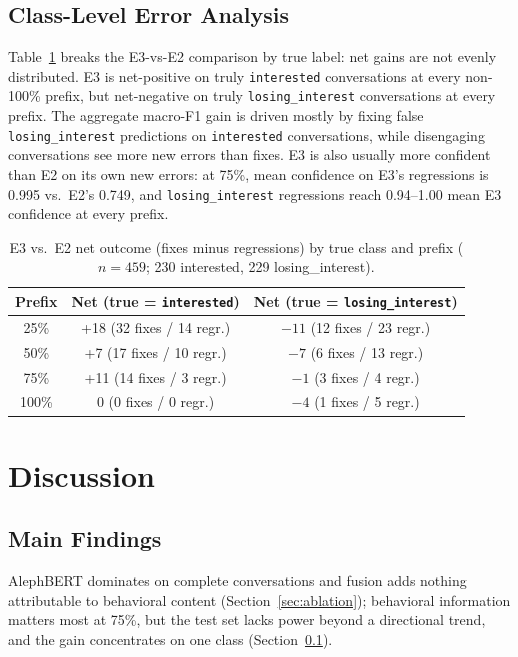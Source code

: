 \documentclass{article}
\begin{document}
\subsection{Class-Level Error Analysis}
\label{sec:classlevel}

Table~\ref{tab:table4} breaks the E3-vs-E2 comparison by true label: net gains are not evenly distributed. E3 is net-positive on truly \texttt{interested} conversations at every non-100\% prefix, but net-negative on truly \texttt{losing\_interest} conversations at every prefix. The aggregate macro-F1 gain is driven mostly by fixing false \texttt{losing\_interest} predictions on \texttt{interested} conversations, while disengaging conversations see more new errors than fixes. E3 is also usually more confident than E2 on its own new errors: at 75\%, mean confidence on E3's regressions is 0.995 vs.\ E2's 0.749, and \texttt{losing\_interest} regressions reach 0.94--1.00 mean E3 confidence at every prefix.

\begin{table}[htbp]
\centering
\small
\begin{tabular}{@{}ccc@{}}
\toprule
Prefix & Net (true = \texttt{interested}) & Net (true = \texttt{losing\_interest}) \\
\midrule
25\%  & +18 (32 fixes / 14 regr.) & $-11$ (12 fixes / 23 regr.) \\
50\%  & +7 (17 fixes / 10 regr.)  & $-7$ (6 fixes / 13 regr.) \\
75\%  & +11 (14 fixes / 3 regr.) & $-1$ (3 fixes / 4 regr.) \\
100\% & 0 (0 fixes / 0 regr.)    & $-4$ (1 fixes / 5 regr.) \\
\bottomrule
\end{tabular}
\caption{E3 vs.\ E2 net outcome (fixes minus regressions) by true class and prefix ($n=459$; 230 interested, 229 losing\_interest).}
\label{tab:table4}
\end{table}

\section{Discussion}
\label{sec:discussion}

\subsection{Main Findings}

AlephBERT dominates on complete conversations and fusion adds nothing attributable to behavioral content (Section~\ref{sec:ablation}); behavioral information matters most at 75\%, but the test set lacks power beyond a directional trend, and the gain concentrates on one class (Section~\ref{sec:classlevel}).
\end{document}
